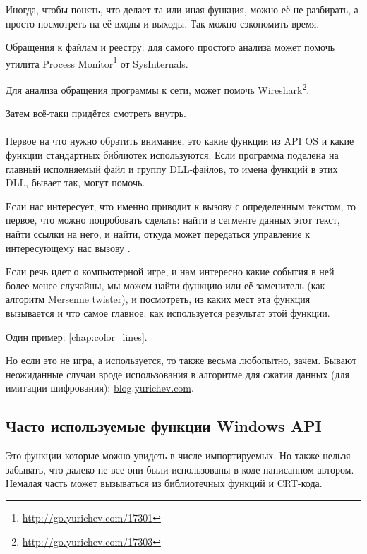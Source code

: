 
Иногда, чтобы понять, что делает та или иная функция, можно её не разбирать, а просто посмотреть на её входы и выходы.
Так можно сэкономить время.

Обращения к файлам и реестру: 
для самого простого анализа может помочь утилита Process Monitor\footnote{\url{http://go.yurichev.com/17301}}
от SysInternals.

Для анализа обращения программы к сети, может помочь  Wireshark\footnote{\url{http://go.yurichev.com/17303}}.

Затем всё-таки придётся смотреть внутрь. \\
\\
Первое на что нужно обратить внимание, это какие функции из \ac{API} \ac{OS}
и какие функции стандартных библиотек используются.
Если программа поделена на главный исполняемый файл и группу DLL-файлов, то имена функций в этих DLL, бывает так, могут помочь.

Если нас интересует, что именно приводит к вызову  с определенным текстом, 
то первое, что можно попробовать сделать: найти в сегменте данных этот текст, найти ссылки на него, и найти, 
откуда может передаться управление к интересующему нас вызову .

Если речь идет о компьютерной игре, и нам интересно какие события в ней более-менее случайны, 
мы можем найти функцию \rand или её заменитель (как алгоритм Mersenne twister), и посмотреть, 
из каких мест эта функция вызывается и что самое главное: как используется результат этой функции.%

Один пример: \ref{chap:color_lines}. 

Но если это не игра, а \rand используется, то также весьма любопытно, зачем. 
Бывают неожиданные случаи вроде использования \rand в алгоритме для сжатия данных (для имитации шифрования):
\href{http://go.yurichev.com/17221}{blog.yurichev.com}.

\subsection{Часто используемые функции Windows API}

Это функции которые можно увидеть в числе импортируемых.
Но также нельзя забывать, что далеко не все они были использованы в коде написанном автором.
Немалая часть может вызываться из библиотечных функций и \ac{CRT}-кода.
	
